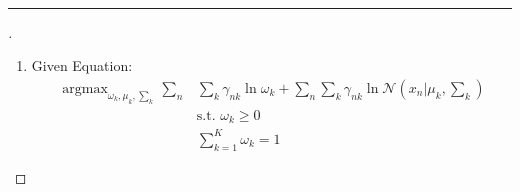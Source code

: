 \documentclass[a4paper, 12pt]{article}
\title{\course \; \assignmentName}
\author{\textbf{\assignmentAuthor} \\ \Small{USC ID - \USCID}}
\date{\assignmentDate}
\DeclareMathOperator*{\argmax}{argmax}
\begin{document}
\thispagestyle{plain}
\maketitle
\hrule
\bigskip


\begin{proof}[]

\hfill

\begin{enumerate}[label={\color{blue}{\textbf{1.\arabic*})}}]
    \item 
        Given Equation: 
        \begin{align*}
            \argmax_{\omega_k, \mu_k, \sum_k} \sum\limits_{n} &\sum\limits_{k} \gamma_{nk} \ln{\omega_k} + \sum\limits_{n} \sum\limits_{k} \gamma_{nk} \ln{\mathcal{N}(x_n | \mu_k, \textstyle\sum\nolimits_{k})}\\
            &\text{s.t. } \omega_k \geq 0\\
            &\sum\limits_{k=1}^{K}\omega_k = 1
        \end{align*}
        

\end{enumerate}
\end{proof}
\end{document}
